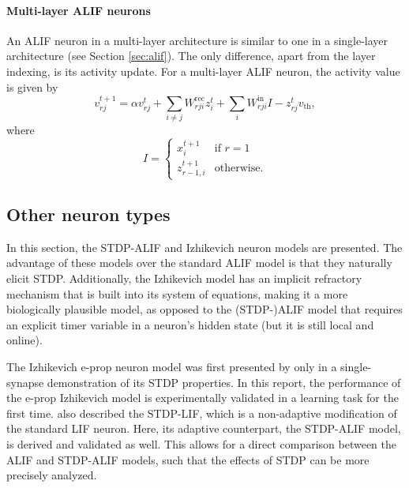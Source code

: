         \paragraph{Multi-layer ALIF neurons}
        An ALIF neuron in a multi-layer architecture is similar to one in a single-layer architecture (see Section \ref{sec:alif}).
        The only difference, apart from the layer indexing, is its activity update.
        For a multi-layer ALIF neuron, the activity value is given by
        \begin{equation}\label{eq:ml_alifV}
        v^{t+1}_{rj} = \alpha v_{rj}^t + \sum_{i\neq j}W^\text{rec}_{rji}z_i^t + \sum_i W^\text{in}_{rji}I - z_{rj}^tv_
        \text{th},
        \end{equation}
        where
        \begin{equation}\label{eq:inpVml}
        I = \begin{cases}
        	x^{t+1}_i       &\mbox{if } r = 1 \\
            z^{t+1}_{r-1,i} &\mbox{otherwise.}
            \end{cases}
        \end{equation}


	\subsection{Other neuron types}

		In this section, the STDP-ALIF and Izhikevich neuron models are presented.
		The advantage of these models over the standard ALIF model is that they naturally elicit STDP.
		Additionally, the Izhikevich model has an implicit refractory mechanism that is built into its system of equations, making it a more biologically plausible model, as opposed to the (STDP-)ALIF model that requires an explicit timer variable in a neuron's hidden state (but it is still local and online).

		The Izhikevich e-prop neuron model was first presented by \citet{traub2020learning} only in a single-synapse demonstration of its STDP properties.
		In this report, the performance of the e-prop Izhikevich model is experimentally validated in a learning task for the first time.
		\citet{traub2020learning} also described the STDP-LIF, which is a non-adaptive modification of the standard LIF neuron.
		Here, its adaptive counterpart, the STDP-ALIF model, is derived and validated as well.
		This allows for a direct comparison between the ALIF and STDP-ALIF models, such that the effects of STDP can be more precisely analyzed.

